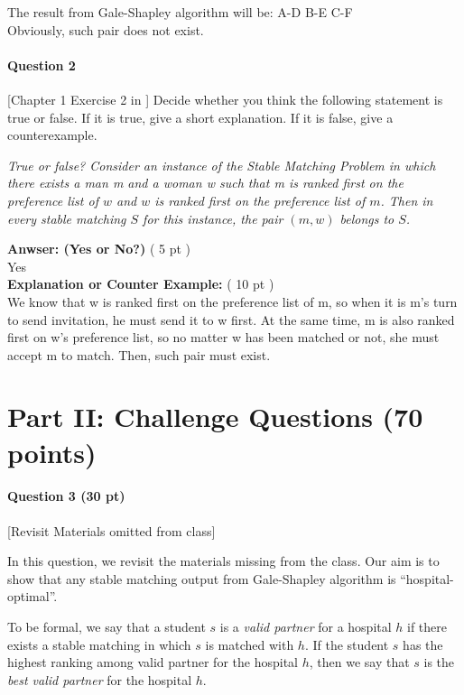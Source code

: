         The result from Gale-Shapley algorithm will be: A-D B-E C-F \\
        Obviously, such pair does not exist. \\
        

    \bigskip

    \paragraph*{Question 2}[Chapter 1 Exercise 2 in \cite{KT05}] Decide whether you think the following statement is true or false. If it is  true, give a short explanation. If it is false, give a counterexample.
    
    \medskip
    
    \emph{True or false? Consider an instance of the Stable Matching Problem in which there exists a man m and a woman w such that m is ranked first on the preference list of $w$ and $w$ is ranked first on the preference list of $m$. Then in  every stable matching $S$ for this instance, the pair $(m, w)$ belongs to $S$.}

    \medskip

    \noindent
    {\bf Anwser: (Yes or No?)} ( 5 pt )\\
        Yes \\
    {\bf Explanation or Counter Example:} ( 10 pt )\\
    We know that w is ranked first on the preference list of m, so when it is m's turn to send invitation, he must send it to w first. At the same time, m is also ranked first on w's preference list, so no matter w has been matched or not, she must accept m to match. Then, such pair must exist.
    \bigskip

\pagebreak

\section*{Part II: Challenge Questions (70 points)}

\paragraph*{Question 3 (30 pt)} [Revisit Materials omitted from class]

In this question, we revisit the materials missing from the class. Our aim is to show that any stable matching output from Gale-Shapley algorithm is ``hospital-optimal''.

To be formal, we say that a student $s$ is a {\em valid partner} for a hospital $h$ if there exists a stable matching in which $s$ is matched with $h$. If the student $s$ has the highest ranking among valid partner for the hospital $h$, then we say that $s$ is the {\em best valid partner} for the hospital $h$.

